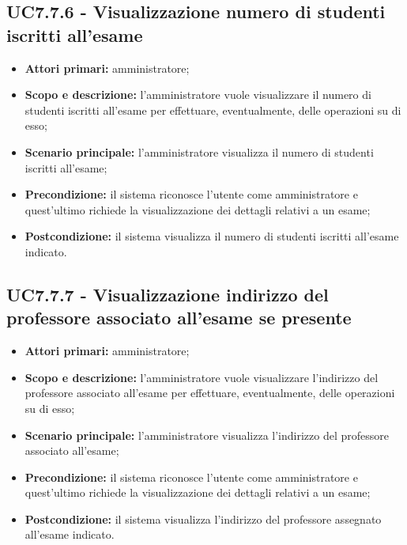 \documentclass[AnalisiDeiRequisiti.tex]{subfiles}
\begin{document}
\subsection{UC7.7.6 - Visualizzazione numero di studenti iscritti all'esame}
\begin{itemize}
	\item \textbf{Attori primari:} amministratore;
	\item \textbf{Scopo e descrizione:} l'amministratore vuole visualizzare il numero di studenti iscritti all'esame per effettuare, eventualmente, delle operazioni su di esso;
	\item \textbf{Scenario principale:} l'amministratore visualizza il numero di studenti iscritti all'esame;
	\item \textbf{Precondizione:} il sistema riconosce l'utente come amministratore e quest'ultimo richiede la visualizzazione dei dettagli relativi a un esame; 
	\item \textbf{Postcondizione:} il sistema visualizza il numero di studenti iscritti all'esame indicato.
\end{itemize}
\subsection{UC7.7.7 - Visualizzazione indirizzo del professore associato all'esame se presente}
\begin{itemize}
	\item \textbf{Attori primari:} amministratore;
	\item \textbf{Scopo e descrizione:} l'amministratore vuole visualizzare l'indirizzo del professore associato all'esame per effettuare, eventualmente, delle operazioni su di esso;
	\item \textbf{Scenario principale:} l'amministratore visualizza l'indirizzo del professore associato all'esame;
	\item \textbf{Precondizione:} il sistema riconosce l'utente come amministratore e quest'ultimo richiede la visualizzazione dei dettagli relativi a un esame; 
	\item \textbf{Postcondizione:} il sistema visualizza l'indirizzo del professore assegnato all'esame indicato.
\end{itemize}
\end{document}
